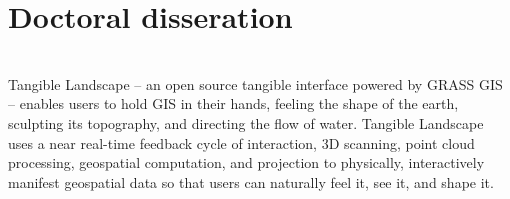 \documentclass[]{baharmon-cv}
\begin{document}
{{{{{\sectiondivider




\section{Doctoral disseration}
\vspace*{0.1cm}
\\ 
\vspace*{0.2cm}
%
Tangible Landscape -- an open source tangible interface powered by GRASS GIS -- 
enables users to hold GIS in their hands, feeling the shape of the earth, sculpting its topography, and directing the flow of water. 
%
Tangible Landscape uses a near real-time feedback cycle of interaction, 3D scanning, point cloud processing, geospatial computation, and projection to physically, interactively manifest geospatial data so that users can naturally feel it, see it, and shape it. 
%
\\

\sectiondivider


}}}}}
\end{document}

